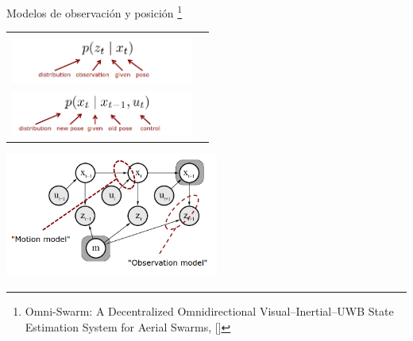 \documentclass[
  24pt, %
  aspectratio=169, %
]{beamer}
\begin{document}
\begin{frame}{Modelos de observación y posición \footnote{Omni-Swarm: A Decentralized Omnidirectional Visual–Inertial–UWB State Estimation System for Aerial Swarms, [\cite{OMNI2022}]}}
  
  
  \addvspace{\medskipamount}
  \noindent
  \begin{tabularx}{\linewidth}{ @{} X X @{} }
    \begin{itemize}
    \item Observación\\
      \includegraphics[width=6cm]{slam5}
    \end{itemize} &
    \begin{itemize}
    \item Posición\\
      \includegraphics[width=6cm]{slam4}  
    \end{itemize}
  \end{tabularx}
  \bigskip %
  \centering
  \includegraphics[width=7cm]{slam3}
\end{frame}
\end{document}
